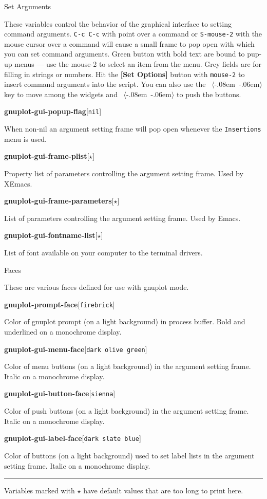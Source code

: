 \documentclass[twocolumn]{article}
\newenvironment{Boxedminipage}%
{\begin{Sbox}\begin{minipage}}%
  {\end{minipage}\end{Sbox}\Ovalbox{\TheSbox}}
\def\key#1{{\textrm \leavevmode\hbox{%
  \raise0.4pt\hbox{$\langle$}\kern-.08em\vtop{%
    \vbox{\hrule\kern-0.4pt
     \hbox{\raise0.4pt\hbox{\vphantom{$\langle$}}#1}}%
    \kern-0.4pt\hrule}%
  \kern-.06em\raise0.4pt\hbox{$\rangle$}}}}
\def\variable#1#2#3{{
    \vspace{-0.2truecm}
    \begin{flushright}
      \begin{minipage}[h]{0.97\linewidth}
        \vspace{-0.2truecm}
        \textbf{#1}\hfill[\texttt{#2}]
        \begin{flushright}
          \begin{minipage}[h]{0.93\linewidth}
            \vspace{-0.2truecm}
            #3
          \end{minipage}
        \end{flushright}
      \end{minipage}
    \end{flushright}
    }}
\def\Star{{$\star$}}
\begin{document}
\begin{center}
  \begin{Boxedminipage}{0.75\linewidth}
    \begin{center}
      {\large Set Arguments}
    \end{center}
  \end{Boxedminipage}
\end{center}

\noindent These variables control the behavior of the graphical
interface to setting command arguments.  \texttt{C-c C-c} with point
over a command or \texttt{S-mouse-2} with the mouse cursor over a
command will cause a small frame to pop open with which you can set
command arguments.  Green button with bold text are bound to pup-up
menus --- use the mouse-2 to select an item from the menu.  Grey fields
are for filling in strings or numbers.  Hit the \textbf{[Set Options]}
button with \texttt{mouse-2} to insert command arguments into the
script.  You can also use the \key{tab} key to move among the widgets
and \key{ret} to push the buttons.

\vspace{2ex}
%
\variable{gnuplot-gui-popup-flag}{nil}{When non-nil an argument
setting frame will pop open whenever the \texttt{Insertions} menu is
used.}
%
\variable{gnuplot-gui-frame-plist}{\Star}{Property list of parameters
  controlling the argument setting frame.  Used by XEmacs.}
%
\variable{gnuplot-gui-frame-parameters}{\Star}{List of parameters
  controlling the argument setting frame.  Used by Emacs.}
%
\variable{gnuplot-gui-fontname-list}{\Star}{List of font available on your
  computer to the terminal drivers.}
%


\begin{center}
  \begin{Boxedminipage}{0.75\linewidth}
    \begin{center}
      {\large Faces}
    \end{center}
  \end{Boxedminipage}
\end{center}

\noindent These are various faces defined for use with gnuplot mode.
\vspace{2ex}

%
\variable{gnuplot-prompt-face}{firebrick}{Color of gnuplot prompt (on a
  light background) in process buffer.  Bold and underlined on a
  monochrome display.}
%
\variable{gnuplot-gui-menu-face}{dark olive green}{Color of menu
  buttons (on a light background) in the argument setting frame.
  Italic on a monochrome display.}
%
\variable{gnuplot-gui-button-face}{sienna}{Color of push buttons (on a
  light background) in the argument setting frame.  Italic on a
  monochrome display.}
%
\variable{gnuplot-gui-label-face}{dark slate blue}{Color of buttons (on
  a light background) used to set label lists in the argument setting
  frame.  Italic on a monochrome display.}
%

\vfill
\hrule
\vspace{0.5ex}
\begin{flushleft}
  \footnotesize{Variables marked with {\Star} have default values that
    are too long to print here.}
\end{flushleft}
\end{document}
